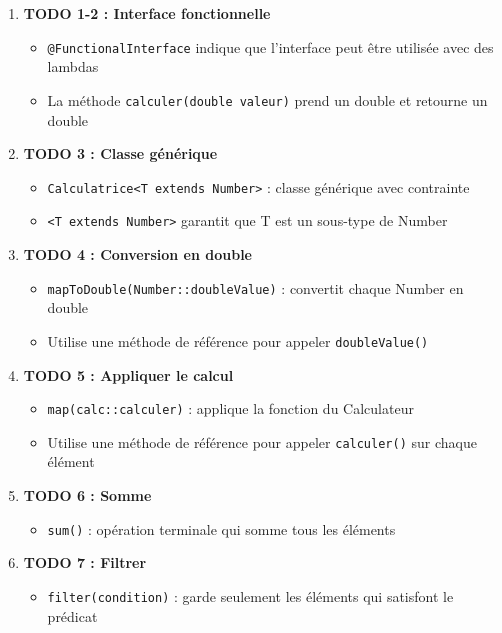 \documentclass[11pt,a4paper]{article}
\begin{document}
\begin{correctionbox}
\begin{enumerate}
    \item \textbf{TODO 1-2 : Interface fonctionnelle}
    \begin{itemize}
        \item \texttt{@FunctionalInterface} indique que l'interface peut être utilisée avec des lambdas
        \item La méthode \texttt{calculer(double valeur)} prend un double et retourne un double
    \end{itemize}
    
    \item \textbf{TODO 3 : Classe générique}
    \begin{itemize}
        \item \texttt{Calculatrice<T extends Number>} : classe générique avec contrainte
        \item \texttt{<T extends Number>} garantit que T est un sous-type de Number
    \end{itemize}
    
    \item \textbf{TODO 4 : Conversion en double}
    \begin{itemize}
        \item \texttt{mapToDouble(Number::doubleValue)} : convertit chaque Number en double
        \item Utilise une méthode de référence pour appeler \texttt{doubleValue()}
    \end{itemize}
    
    \item \textbf{TODO 5 : Appliquer le calcul}
    \begin{itemize}
        \item \texttt{map(calc::calculer)} : applique la fonction du Calculateur
        \item Utilise une méthode de référence pour appeler \texttt{calculer()} sur chaque élément
    \end{itemize}
    
    \item \textbf{TODO 6 : Somme}
    \begin{itemize}
        \item \texttt{sum()} : opération terminale qui somme tous les éléments
    \end{itemize}
    
    \item \textbf{TODO 7 : Filtrer}
    \begin{itemize}
        \item \texttt{filter(condition)} : garde seulement les éléments qui satisfont le prédicat
    \end{itemize}
    

\end{enumerate}
\end{correctionbox}
\end{document}
